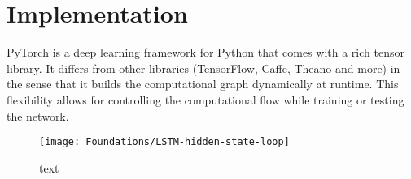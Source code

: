 			
			
	\section{Implementation}
		PyTorch is a deep learning framework for Python that comes with a rich tensor library.
		It differs from other libraries (TensorFlow, Caffe, Theano and more) in the sense that it builds the computational graph dynamically at runtime.
		This flexibility allows for controlling the computational flow while training or testing the network.
		
		
		\begin{figure}[t]
			\centering
			\texttt{[image: Foundations/LSTM-hidden-state-loop]}
			\caption[text]
					{text
					 \label{fig:LSTM-ways-to-use-hidden-state}}
		\end{figure}

